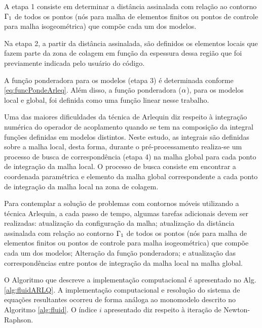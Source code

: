 A etapa 1 consiste em determinar a distância assinalada com relação ao contorno $\Gamma_1$ de todos os pontos (nós para malha de elementos finitos ou pontos de controle para malha isogeométrica) que compõe cada um dos modelos.

Na etapa 2, a partir da distância assinalada, são definidos os elementos locais que fazem parte da zona de colagem em função da espessura dessa região que foi previamente indicada pelo usuário do código.

A função ponderadora para os modelos (etapa 3) é  determinada conforme \autoref{eq:funcPondeArleq}. Além disso, a função ponderadora ($\alpha$), para os modelos local e global, foi definida como uma função linear nesse trabalho. 

Uma das maiores dificuldades da técnica de Arlequin diz respeito à integração numérica do operador de acoplamento quando se tem na composição da integral funções definidas em modelos distintos. Neste estudo, as integrais são definidas sobre a malha local, desta forma, durante o pré-processamento realiza-se um processo de busca de correspondência (etapa 4) na malha global para cada ponto de integração da malha local. O processo de busca consiste em encontrar a coordenada paramétrica e elemento da malha global correspondente a cada ponto de integração da malha local na zona de colagem.

Para contemplar a solução de problemas com contornos móveis utilizando a técnica Arlequin, a cada passo de tempo, algumas tarefas adicionais devem ser realizadas: atualização da configuração da malha; atualização da distância assinalada com relação ao contorno $\Gamma_1$ de todos os pontos (nós para malha de elementos finitos ou pontos de controle para malha isogeométrica) que compõe cada um dos modelos;  Alteração da função ponderadora; e atualização das correspondências entre pontos de integração da malha local na malha global.

O Algoritmo que descreve a implementação computacional é apresentado no Alg. \ref{alg:fluidARLQ}. A implementação computacional e resolução do sistema de equações resultantes ocorreu de forma análoga ao monomodelo descrito no Algoritmo \ref{alg:fluid}. O índice $i$ apresentado diz respeito à iteração de Newton-Raphson.

